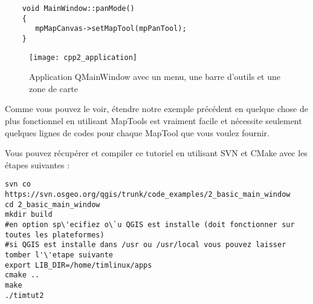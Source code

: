 \begin{verbatim}
    void MainWindow::panMode()
    {
       mpMapCanvas->setMapTool(mpPanTool); 
    }
\end{verbatim}

\begin{figure}[ht]
   \begin{center}
   \caption{Application QMainWindow avec un menu, une barre d'outils et une zone de carte
\osxcaption}\label{fig:cpp2_application}\smallskip
   \texttt{[image: cpp2\_application]}
\end{center}
\end{figure}


Comme vous pouvez le voir, \'etendre notre exemple pr\'ec\'edent en quelque chose de 
plus fonctionnel en utilisant MapTools est vraiment facile et n\'ecessite 
seulement quelques lignes de codes pour chaque MapTool que vous voulez fournir.

Vous pouvez r\'ecup\'erer et compiler ce tutoriel en utilisant SVN et CMake avec 
les \'etapes suivantes :

\begin{verbatim}
svn co https://svn.osgeo.org/qgis/trunk/code_examples/2_basic_main_window
cd 2_basic_main_window
mkdir build
#en option sp\'ecifiez o\`u QGIS est installe (doit fonctionner sur toutes les plateformes)
#si QGIS est installe dans /usr ou /usr/local vous pouvez laisser tomber l'\'etape suivante
export LIB_DIR=/home/timlinux/apps
cmake ..
make
./timtut2
\end{verbatim}
